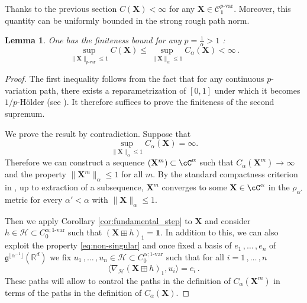 \documentclass[12pt,a4paper]{article}
\numberwithin{equation}{section}
\newcommand\paul[1]{\textcolor{red}{{(paul) #1}}}
\def\fX{\mathbf{X}}
\theoremstyle{plain}
\newtheorem{lemma}[theorem]{Lemma}
\theoremstyle{definition}
\theoremstyle{remark}
\begin{document}
Thanks to the previous section $C(\mathbf{X})<\infty$ for any \( \mathbf{X} \in \mathcal{C}^{p\text{-var}}_{\mathbf{1}} \). Moreover, this quantity can be uniformly bounded in the strong rough path norm.

\begin{lemma}\label{finitude et linéarité}
	One has the  finiteness bound for any $p = \frac{1}{\alpha} > 1$ :
	\begin{equation}\label{finitude}
		\sup_{\|\mathbf{X}\|_{p\text{-var}}\leq  1}  C(\mathbf X) \leq \sup_{\|\mathbf{X}\|_{\alpha}\leq  1} C_{\alpha}(\mathbf X)<\infty\,.
	\end{equation}
\end{lemma}
\begin{proof}
The first inequality follows from the fact that for any continuous $p$-variation path, there exists a reparametrization of $[0,1]$ under which it becomes $1 /p$-H\"older (see \cite[Proposition 5.14]{frizbook}). It therefore suffices to prove the finiteness of the second supremum.


We prove the result by contradiction. Suppose that
\[
\sup_{\|\mathbf{X}\|_{\alpha}\leq 1} C_{\alpha}(\mathbf{X}) = \infty.
\]
Therefore we can construct a sequence $(\fX^m) \subset \cC^{{\alpha}}$ such that $C_\alpha(\fX^m) \to \infty$ and the property $\|\fX^m\|_{\alpha} \leq 1$ for all $m$. By the standard compactness criterion in \cite[Proposition 8.17]{frizbook}, up to extraction of a subsequence, $\fX^m$ converges to some $\fX \in \cC^{\alpha}$ in the $\rho_{\alpha'}$ metric for every $\alpha' < \alpha$ with $\|\fX\|_\alpha \leq 1$.

 Then we apply Corollary \ref{cor:fundamental_step} to  $\fX$ and consider  $h\in \mathcal{H}\subset C^{\alpha;1\text{-var}}_0$  such that $(\mathbf X\boxplus h)_{1}=\mathbf 1$. In addition to this, we can also exploit the property \eqref{eq:non-singular} and once fixed a basis of $e_1\,,\ldots \,,e_n$ of $\mathfrak{g}^{\lfloor\alpha^{-1} \rfloor}(\mathbb{R}^d) $ we fix $u_1\,,\ldots \,,u_n\in \mathcal{H}\subset C^{\alpha;1\text{-var}}_0$ such that for all $i=1\,, \ldots\,, n$
\begin{equation}\label{eq:surjectivity}
\langle \nabla_{\mathcal{H}} (\mathbf{X} \boxplus h)_1, u_i \rangle=e_i\,.
\end{equation}
These paths will allow to control the paths in the definition of $C_\alpha(\fX^m)$ in terms of the paths in the definition  of $C_\alpha(\fX)$.


\end{proof}
\end{document}
